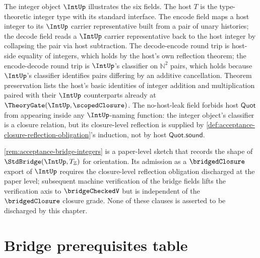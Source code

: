 \begin{remark}
\label{rem:acceptance-bridge-integers}
The integer object $\IntUp$ illustrates the six fields. The host $T$ is the type-theoretic integer type with its standard interface. The encode field maps a host integer to its $\IntUp$ carrier representative built from a pair of unary histories; the decode field reads a $\IntUp$ carrier representative back to the host integer by collapsing the pair via host subtraction. The decode-encode round trip is host-side equality of integers, which holds by the host's own reflection theorem; the encode-decode round trip is $\IntUp$'s classifier on $\mathbb{N}^2$ pairs, which holds because $\IntUp$'s classifier identifies pairs differing by an additive cancellation. Theorem preservation lists the host's basic identities of integer addition and multiplication paired with their $\IntUp$ counterparts already at $\TheoryGate(\IntUp, \scopedClosure)$. The no-host-leak field forbids host $\mathsf{Quot}$ from appearing inside any $\IntUp$-naming function: the integer object's classifier is a closure relation, but its closure-level reflection is supplied by \autoref{def:acceptance-closure-reflection-obligation}'s induction, not by host $\mathsf{Quot.sound}$.
\end{remark}

\begin{remark}
\label{rem:acceptance-bridge-integers-sketch-disclaimer}
\autoref{rem:acceptance-bridge-integers} is a paper-level sketch that records the shape of $\StdBridge(\IntUp, T_{\mathbb{Z}})$ for orientation. Its admission as a $\bridgedClosure$ export of $\IntUp$ requires the closure-level reflection obligation discharged at the paper level; subsequent machine verification of the bridge fields lifts the verification axis to $\bridgeCheckedV$ but is independent of the $\bridgedClosure$ closure grade. None of these clauses is asserted to be discharged by this chapter.
\end{remark}

\section{Bridge prerequisites table}
\label{sec:acceptance-bridge-prerequisites-table}

